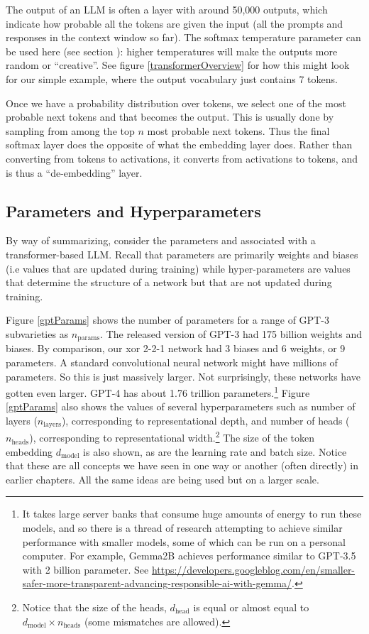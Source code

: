 The output of an LLM is often a  layer with around 50,000
outputs, which  indicate how probable all the tokens are given the input (all
the prompts and responses in the context window so far). The softmax
temperature parameter can be used here (see section
): higher temperatures will make the outputs more
random or ``creative''. See figure \ref{transformerOverview} for how this might
look for our simple example, where the output vocabulary just contains 7
tokens. 

Once we have a probability distribution over tokens, we select one of the most
probable next tokens and that becomes the output. This is usually done by
sampling from among the top $n$ most probable next tokens. Thus the final
softmax layer does the opposite of what the embedding layer does. Rather than
converting from tokens to activations, it converts from activations to tokens,
and is thus a ``de-embedding'' layer.

\subsection{Parameters and Hyperparameters}

By way of summarizing, consider the parameters and  
associated with a transformer-based LLM. Recall that parameters are primarily
weights and biases (i.e values that are updated during training) while
hyper-parameters are values that determine the structure of a network but that
are not updated during training.

Figure \ref{gptParams} shows the  number of parameters for a range of GPT-3
subvarieties as $n_\text{params}$. The released version of GPT-3 had 175
billion weights and biases. By comparison, our xor 2-2-1 network had 3 biases
and 6 weights, or 9 parameters. A standard convolutional neural network might
have millions of parameters. So this is just massively larger. Not
surprisingly, these networks have gotten even larger. GPT-4 has about 1.76
trillion parameters.\footnote{It takes large server banks that  consume huge
amounts of energy to run these models, and so there is a thread of research
attempting to achieve similar performance with smaller models, some of which
can be run on a  personal computer. For example, Gemma2B achieves performance
similar to GPT-3.5 with 2 billion parameter. See
\url{https://developers.googleblog.com/en/smaller-safer-more-transparent-advancing-responsible-ai-with-gemma/}.}
Figure \ref{gptParams} also shows the values of several hyperparameters such as
number of layers ($n_\text{layers}$), corresponding to representational depth,
and number of heads ($n_\text{heads}$), corresponding to representational
width.\footnote{Notice that the size of the heads, $d_\text{head}$ is equal or
almost equal to  $d_\text{model} \times n_\text{heads}$ (some mismatches are
allowed).} The size of the token embedding  $d_\text{model}$ is also shown, as
are the learning rate and batch size. Notice that these are all concepts we
have seen in one way or another (often directly) in earlier chapters. All the
same ideas are being used but on a larger scale.

